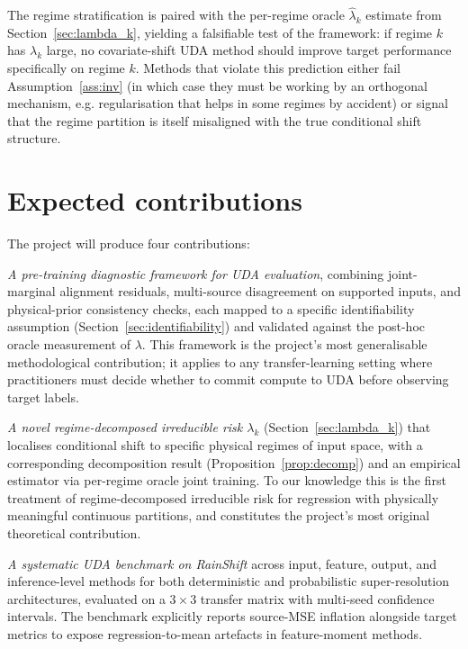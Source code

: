 \documentclass{article}
\begin{document}
The regime stratification is paired with the per-regime oracle
$\widehat{\lambda}_k$ estimate from Section~\ref{sec:lambda_k},
yielding a falsifiable test of the framework: if regime $k$ has
$\lambda_k$ large, no covariate-shift UDA method should improve target
performance specifically on regime $k$. Methods that violate this
prediction either fail Assumption~\ref{ass:inv} (in which case they
must be working by an orthogonal mechanism, e.g. regularisation that
helps in some regimes by accident) or signal that the regime
partition is itself misaligned with the true conditional shift
structure.

\section{Expected contributions}

The project will produce four contributions:

\textit{A pre-training diagnostic framework for UDA evaluation},
combining joint-marginal alignment residuals, multi-source disagreement
on supported inputs, and physical-prior consistency checks, each
mapped to a specific identifiability assumption
(Section~\ref{sec:identifiability}) and validated against the
post-hoc oracle measurement of $\lambda$. This framework is the
project's most generalisable methodological contribution; it applies
to any transfer-learning setting where practitioners must decide
whether to commit compute to UDA before observing target labels.

\textit{A novel regime-decomposed irreducible risk
$\lambda_k$} (Section~\ref{sec:lambda_k}) that localises conditional
shift to specific physical regimes of input space, with a
corresponding decomposition result (Proposition~\ref{prop:decomp})
and an empirical estimator via per-regime oracle joint training. To
our knowledge this is the first treatment of regime-decomposed
irreducible risk for regression with physically meaningful continuous
partitions, and constitutes the project's most original theoretical
contribution.

\textit{A systematic UDA benchmark on RainShift} across input, feature,
output, and inference-level methods for both deterministic and
probabilistic super-resolution architectures, evaluated on a
$3\times 3$ transfer matrix with multi-seed confidence intervals. The
benchmark explicitly reports source-MSE inflation alongside target
metrics to expose regression-to-mean artefacts in feature-moment
methods.
\end{document}
